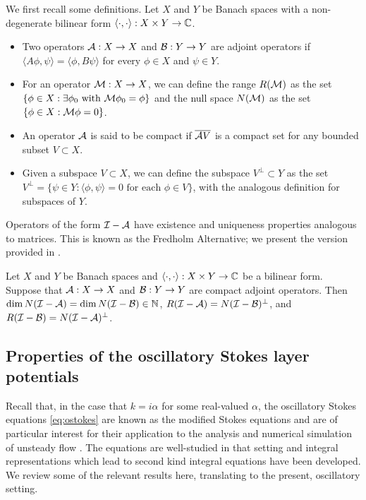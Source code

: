 We first recall some definitions.
Let $X$ and $Y$ be Banach spaces with a non-degenerate
bilinear form $\langle \cdot ,\cdot \rangle: X\times Y \to \mathbb{C}$.
\begin{itemize}
\item Two operators ${\mathcal A}:X\to X$ and ${\mathcal B}:Y\to Y$ are
adjoint operators if
$\langle A \phi,\psi \rangle = \langle \phi, B\psi \rangle$
for every $\phi \in X$ and $\psi \in Y$.
\item For an operator ${\mathcal M}:X\to X$, we can define the range
  $R({\mathcal M})$ as the set $\{\phi \in X: \exists \phi_0 \textrm{ with }
  {\mathcal M}\phi_0 = \phi\}$ and the null space $N({\mathcal M})$ as the
  set $\{\phi \in X: {\mathcal M} \phi = 0 \}$.
\item An operator ${\mathcal A}$ is said to be compact if
  $\overline{{\mathcal A} V}$ is a compact set for any
  bounded subset $V\subset X$.
\item Given a subspace $V\subset X$,
  we can define the subspace $V^\perp\subset Y$ as the
  set $V^\perp = \{ \psi \in Y: \langle \phi,\psi \rangle = 0
  \textrm{ for each } \phi \in V \}$, with the analogous
  definition for subspaces of $Y$.
\end{itemize}

Operators of the form $\mathcal I-{\mathcal A}$
have existence and uniqueness properties analogous to
matrices. This is known as the Fredholm Alternative;
we present the version provided in \cite{colton1983integral}.

\begin{thrm}
  Let $X$ and $Y$ be Banach spaces and
  $\langle \cdot,\cdot \rangle: X\times Y \to \mathbb{C}$ be
  a bilinear form. Suppose that ${\mathcal A}: X\to X$ and
  ${\mathcal B}:Y \to Y$ are compact adjoint operators. Then
  $\dim N(\mathcal I-{\mathcal A}) = \dim N(\mathcal I-{\mathcal B}) \in \mathbb{N}$,
  $R(\mathcal I-{\mathcal A}) = N(\mathcal I-{\mathcal B})^{\perp}$, and
  $R(\mathcal I-{\mathcal B}) = N(\mathcal I-{\mathcal A})^\perp$.
\end{thrm}

\subsection{Properties of the oscillatory Stokes layer
  potentials}

Recall that, in the case that $k=i\alpha$ for some real-valued $\alpha$,
the oscillatory Stokes equations \cref{eq:ostokes}
are known as the modified Stokes equations and are of particular
interest for their application to the analysis and numerical
simulation of unsteady flow
\cite{Pozrikidis1992,biros2002embedded,
  jiang2013second,ladyzhenskaya1969mathematical}.
The equations are well-studied in that setting and
integral representations which lead to second kind
integral equations have been developed. We review
some of the relevant results here, translating to
the present, oscillatory setting.

